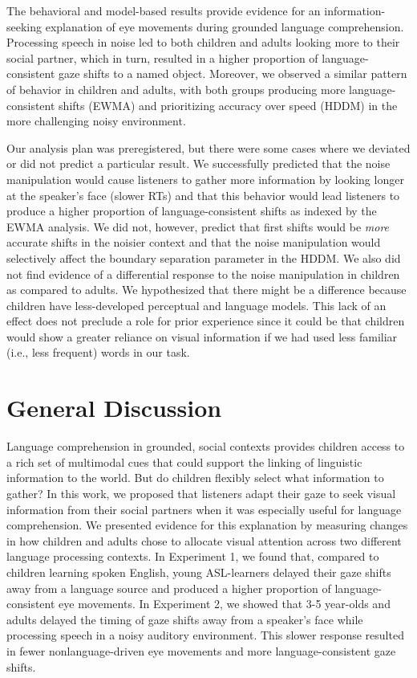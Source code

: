 \documentclass[,man,floatsintext]{apa6}
\begin{document}
The behavioral and model-based results provide evidence for an information-seeking explanation of eye movements during grounded language comprehension. Processing speech in noise led to both children and adults looking more to their social partner, which in turn, resulted in a higher proportion of language-consistent gaze shifts to a named object. Moreover, we observed a similar pattern of behavior in children and adults, with both groups producing more language-consistent shifts (EWMA) and prioritizing accuracy over speed (HDDM) in the more challenging noisy environment.

Our analysis plan was preregistered, but there were some cases where we deviated or did not predict a particular result. We successfully predicted that the noise manipulation would cause listeners to gather more information by looking longer at the speaker's face (slower RTs) and that this behavior would lead listeners to produce a higher proportion of language-consistent shifts as indexed by the EWMA analysis. We did not, however, predict that first shifts would be \emph{more} accurate shifts in the noisier context and that the noise manipulation would selectively affect the boundary separation parameter in the HDDM. We also did not find evidence of a differential response to the noise manipulation in children as compared to adults. We hypothesized that there might be a difference because children have less-developed perceptual and language models. This lack of an effect does not preclude a role for prior experience since it could be that children would show a greater reliance on visual information if we had used less familiar (i.e., less frequent) words in our task.

\hypertarget{general-discussion}{%
\section{General Discussion}\label{general-discussion}}

Language comprehension in grounded, social contexts provides children access to a rich set of multimodal cues that could support the linking of linguistic information to the world. But do children flexibly select what information to gather? In this work, we proposed that listeners adapt their gaze to seek visual information from their social partners when it was especially useful for language comprehension. We presented evidence for this explanation by measuring changes in how children and adults chose to allocate visual attention across two different language processing contexts. In Experiment 1, we found that, compared to children learning spoken English, young ASL-learners delayed their gaze shifts away from a language source and produced a higher proportion of language-consistent eye movements. In Experiment 2, we showed that 3-5 year-olds and adults delayed the timing of gaze shifts away from a speaker's face while processing speech in a noisy auditory environment. This slower response resulted in fewer nonlanguage-driven eye movements and more language-consistent gaze shifts.
\end{document}
